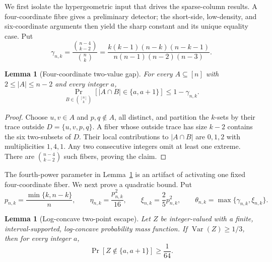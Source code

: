 \documentclass[11pt]{article}
\newtheorem{lemma}[theorem]{Lemma}
\theoremstyle{definition}
\theoremstyle{remark}
\newcommand{\1}{\mathbf 1}
\newcommand{\Var}{\operatorname{Var}}
\begin{document}
We first isolate the hypergeometric input that drives the sparse-column
results.  A four-coordinate fibre gives a preliminary detector; the short-side,
low-density, and six-coordinate arguments then yield the sharp constant and
its unique equality case.  Put
\begin{equation}\label{eq:four-fiber-gap}
 \gamma_{n,k}
 =\frac{\binom{n-4}{k-2}}{\binom nk}
 =\frac{k(k-1)(n-k)(n-k-1)}{n(n-1)(n-2)(n-3)}.
\end{equation}

\begin{lemma}[Four-coordinate two-value gap]
\label{lem:four-coordinate-gap}
For every $A\subseteq[n]$ with $2\le|A|\le n-2$ and every integer $a$,
\[
 \Pr_{B\in\binom{[n]}k}[|A\cap B|\in\{a,a+1\}]
 \le1-\gamma_{n,k}.
\]
\end{lemma}

\begin{proof}
Choose $u,v\in A$ and $p,q\notin A$, all distinct, and partition the
$k$-sets by their trace outside $D=\{u,v,p,q\}$.  A fiber whose outside
trace has size $k-2$ contains the six two-subsets of $D$.  Their local
contributions to $|A\cap B|$ are $0,1,2$ with multiplicities $1,4,1$.
Any two consecutive integers omit at least one extreme.  There are
$\binom{n-4}{k-2}$ such fibers, proving the claim.
\end{proof}

The fourth-power parameter in Lemma~\ref{lem:four-coordinate-gap} is an
artifact of activating one fixed four-coordinate fiber.  We next prove a
quadratic bound.  Put
\begin{equation}\label{eq:quadratic-gap}
 p_{n,k}=\frac{\min\{k,n-k\}}n,
 \qquad
 \eta_{n,k}=\frac{p_{n,k}^2}{16},
 \qquad
 \xi_{n,k}=\frac25p_{n,k}^2,
 \qquad
 \theta_{n,k}=\max\{\gamma_{n,k},\xi_{n,k}\}.
\end{equation}

\begin{lemma}[Log-concave two-point escape]
\label{lem:log-concave-two-point}
Let $Z$ be integer-valued with a finite, interval-supported, log-concave
probability mass function.  If $\Var(Z)\ge1/3$, then for every integer $a$,
\[
 \Pr[Z\notin\{a,a+1\}]\ge\frac1{64}.
\]
\end{lemma}
\end{document}

